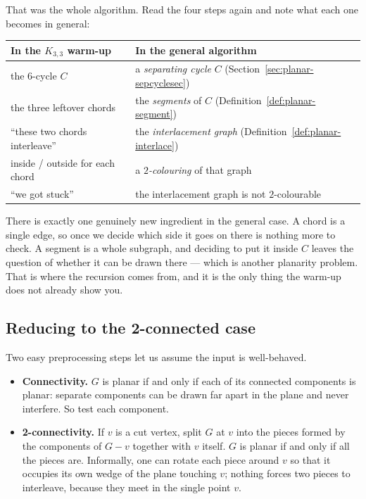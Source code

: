 \begin{intuition}
That was the whole algorithm. Read the four steps again and note what each one
becomes in general:

\begin{center}
\begin{tabular}{@{}ll@{}}
\toprule
\textbf{In the $K_{3,3}$ warm-up} & \textbf{In the general algorithm} \\
\midrule
the $6$-cycle $C$ & a \emph{separating cycle} $C$
  (Section~\ref{sec:planar-sepcyclesec}) \\
the three leftover chords & the \emph{segments} of $C$
  (Definition~\ref{def:planar-segment}) \\
``these two chords interleave'' & the \emph{interlacement graph}
  (Definition~\ref{def:planar-interlace}) \\
inside / outside for each chord & a \emph{$2$-colouring} of that graph \\
``we got stuck'' & the interlacement graph is not $2$-colourable \\
\bottomrule
\end{tabular}
\end{center}

There is exactly one genuinely new ingredient in the general case. A chord is
a single edge, so once we decide which side it goes on there is nothing more to
check. A segment is a whole subgraph, and deciding to put it inside $C$ leaves
the question of whether it can be drawn there --- which is another planarity
problem. That is where the recursion comes from, and it is the only thing the
warm-up does not already show you.
\end{intuition}

\subsection{Reducing to the 2-connected case}

Two easy preprocessing steps let us assume the input is well-behaved.

\begin{itemize}
  \item \textbf{Connectivity.} $G$ is planar if and only if each of its
        connected components is planar: separate components can be drawn far
        apart in the plane and never interfere. So test each component.
  \item \textbf{2-connectivity.} If $v$ is a cut vertex, split $G$ at $v$ into
        the pieces formed by the components of $G - v$ together with $v$
        itself. $G$ is planar if and only if all the pieces are. Informally,
        one can rotate each piece around $v$ so that it occupies its own wedge
        of the plane touching $v$; nothing forces two pieces to interleave,
        because they meet in the single point $v$.
\end{itemize}

